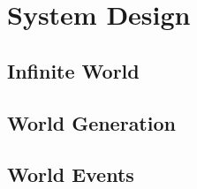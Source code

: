 \chapter{System Design}

\section{Infinite World}

\section{World Generation}

\section{World Events}